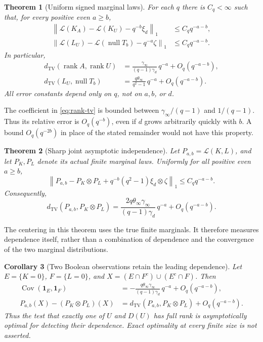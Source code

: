 \documentclass[11pt]{article}
\newtheorem{theorem}{Theorem}[section]
\newtheorem{corollary}[theorem]{Corollary}
\theoremstyle{definition}
\newcommand{\Law}{\mathcal L}
\newcommand{\TV}{d_{\mathrm{TV}}}
\newcommand{\rank}{\operatorname{rank}}
\newcommand{\nul}{\operatorname{null}}
\newcommand{\Cov}{\operatorname{Cov}}
\newcommand{\normone}[1]{\left\|#1\right\|_1}
\newcommand{\ind}{\mathbf 1}
\begin{document}
\begin{theorem}[Uniform signed marginal laws]\label{thm:marginals}
For each \(q\) there is \(C_q<\infty\) such that, for every positive even
\(a\ge b\),
\begin{align}
 \normone{\Law(K_A)-\Law(K_U)-q^{-b}\xi_d}
       &\le C_q q^{-a-b},\label{eq:rank-expansion}\\
 \normone{\Law(L_U)-\Law(\nul T_b)-q^{-a}\zeta}
       &\le C_q q^{-a-b}.\label{eq:defect-expansion}
\end{align}
In particular,
\begin{align}
 \TV(\rank A,\rank U)
   &=\frac{\gamma_\infty}{(q-1)\gamma_d}\,q^{-a}
      +O_q(q^{-a-b}),\label{eq:rank-tv}\\
 \TV(L_U,\nul T_b)
   &=\frac{q\theta_\infty}{q^2-1}\,q^{-a}
      +O_q(q^{-a-b}).\label{eq:defect-tv}
\end{align}
All error constants depend only on \(q\), not on \(a,b\), or \(d\).
\end{theorem}

The coefficient in \eqref{eq:rank-tv} is bounded between
\(\gamma_\infty/(q-1)\) and \(1/(q-1)\). Thus its relative error is
\(O_q(q^{-b})\), even if \(d\) grows arbitrarily quickly with \(b\).
A bound \(O_q(q^{-2b})\) in place of the stated remainder would not have
this property.

\begin{theorem}[Sharp joint asymptotic independence]\label{thm:joint}
Let \(P_{a,b}=\Law(K,L)\), and let \(P_K,P_L\) denote its actual finite
marginal laws. Uniformly for all positive even \(a\ge b\),
\begin{equation}\label{eq:joint-expansion}
 \normone{P_{a,b}-P_K\otimes P_L
            +q^{-b}(q^2-1)\xi_d\otimes\zeta}
     \le C_q q^{-a-b}.
\end{equation}
Consequently,
\begin{equation}\label{eq:joint-tv}
 \TV(P_{a,b},P_K\otimes P_L)
   =\frac{2q\theta_\infty\gamma_\infty}{(q-1)\gamma_d}\,q^{-a}
      +O_q(q^{-a-b}).
\end{equation}
\end{theorem}

The centering in this theorem uses the true finite marginals. It
therefore measures dependence itself, rather than a combination of
dependence and the convergence of the two marginal distributions.

\begin{corollary}[Two Boolean observations retain the leading dependence]
\label{cor:xor}
Let \(E=\{K=0\}\), \(F=\{L=0\}\), and
\(X=(E\cap F^c)\cup(E^c\cap F)\). Then
\begin{align}
 \Cov(\ind_E,\ind_F)
   &=-\frac{q\theta_\infty\gamma_\infty}{(q-1)\gamma_d}\,q^{-a}
       +O_q(q^{-a-b}),\label{eq:covariance}\\
 P_{a,b}(X)-(P_K\otimes P_L)(X)
   &=\TV(P_{a,b},P_K\otimes P_L)+O_q(q^{-a-b}).\label{eq:xor}
\end{align}
Thus the test that exactly one of \(U\) and \(D(U)\) has full rank is
asymptotically optimal for detecting their dependence. Exact optimality
at every finite size is not asserted.
\end{corollary}
\end{document}
